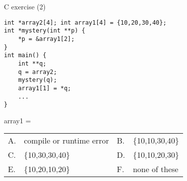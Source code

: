 \begin{frame}[fragile]{C exercise (2)}
\lstset{language=C,style=smaller}
\begin{lstlisting}
int *array2[4]; int array1[4] = {10,20,30,40};
int *mystery(int **p) {
    *p = &array1[2];
}
int main() {
    int **q;
    q = array2;
    mystery(q);
    array1[1] = *q;
    ...
}
\end{lstlisting}
array1 = \\
\begin{tabular}{llll}
A. & compile or runtime error   & B. & \{10,10,30,40\} \\
C. & \{10,30,30,40\} & D. & \{10,10,20,30\} \\
E. & \{10,20,10,20\} & F. & none of these \\
\end{tabular}
\end{frame}
